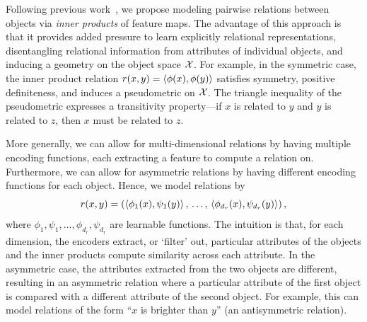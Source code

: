 Following previous work~\citep[e.g.,][]{webbEmergentSymbols2021, kergNeuralArchitecture2022, altabaaAbstractorsRelationalCrossattention2024}, we propose modeling pairwise relations between objects via \textit{inner products} of feature maps.
The advantage of this approach is that it provides added pressure to learn explicitly relational representations, disentangling relational information from attributes of individual objects, and inducing a geometry on the object space ${\mathcal{X}}$.
For example, in the symmetric case, the inner product relation $r(x,y) = \left \langle \phi(x), \phi(y) \right\rangle$ satisfies symmetry, positive definiteness, and induces a pseudometric on ${\mathcal{X}}$. The triangle inequality of the pseudometric expresses a transitivity property---if $x$ is related to $y$ and $y$ is related to $z$, then $x$ must be related to $z$.

More generally, we can allow for multi-dimensional relations by having multiple encoding functions, each extracting a feature to compute a relation on. Furthermore, we can allow for asymmetric relations by having different encoding functions for each object. Hence, we model relations by
\begin{equation}\label{eq:relation_function}
    r(x, y) = \left(
        \left \langle \phi_1(x), \psi_1(y) \right\rangle,\, \ldots,\, \left \langle \phi_{d_r}(x), \psi_{d_r}(y) \right\rangle\right),
\end{equation}
where $\phi_1, \psi_1, \ldots, \phi_{d_r}, \psi_{d_r}$ are learnable functions. 
The intuition is that, for each dimension, the encoders extract, or `filter' out, particular attributes of the objects and the inner products compute similarity across each attribute.
In the asymmetric case, the attributes extracted from the two objects are different, resulting in an asymmetric relation where a particular attribute of the first object is compared with a different attribute of the second object. For example, this can model relations of the form ``$x$ is brighter than $y$'' (an antisymmetric relation).

